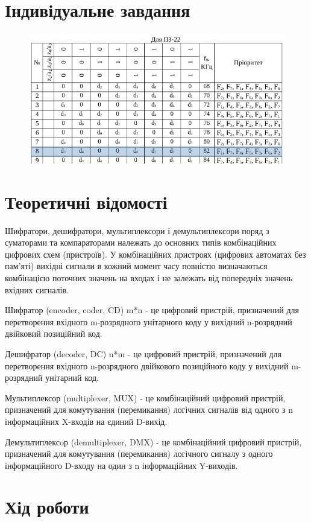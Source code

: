 \documentclass{article}
\begin{document}
\begin{normalsize}
	\section*{Індивідуальне завдання}
\begin{figure}[H]
		\centering
		\includegraphics[scale=0.75]{v}
	\end{figure}	

	\section*{Теоретичні відомості}
	Шифратори, дешифратори, мультиплексори і демультиплексори поряд з суматорами та компараторами належать до основних типів комбінаційних цифрових схем (пристроїв). У комбінаційних пристроях (цифрових автоматах без пам’яті) вихідні сигнали в кожний момент часу повністю визначаються комбінацією поточних значень на входах і не залежать від попередніх значень вхідних сигналів.
	
	Шифратор (encoder, coder, CD) m*n - це цифровий пристрій, призначений для перетворення вхідного m-розрядного унітарного коду у вихідний n-розрядний двійковий позиційний код.
	
	Дешифратор (decoder, DC) n*m - це цифровий пристрій, призначений для перетворення вхідного n-розрядного двійкового позиційного коду у вихідний m-розрядний унітарний код.
	
	Мультиплексор (multiplexer, MUX) - це комбінаційний цифровий пристрій, призначений для комутування (перемикання) логічних сигналів від одного з n інформаційних X-входів на єдиний D-вихід.
	
	Демультиплексoр (demultiplexer, DMX) - це комбінаційний цифровий пристрій, призначений для комутування (перемикання) логічного сигналу з одного інформаційного D‑входу на один з n інформаційних Y‑виходів.
	
	\section*{Хід роботи}
	\begingroup
	\setlength{\belowdisplayskip}{-15pt}
	\setlength{\abovedisplayskip}{0pt}

\end{normalsize}
\end{document}
